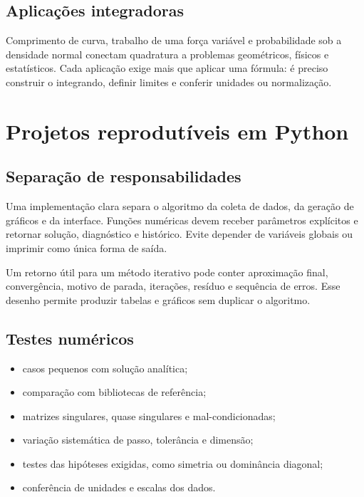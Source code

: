 \documentclass[12pt,a4paper,openany]{book}
\begin{document}
\section{Aplicações integradoras}



Comprimento de curva, trabalho de uma força variável e probabilidade sob a densidade normal conectam quadratura a problemas geométricos, físicos e estatísticos. Cada aplicação exige mais que aplicar uma fórmula: é preciso construir o integrando, definir limites e conferir unidades ou normalização.



\chapter{Projetos reprodutíveis em Python}



\section{Separação de responsabilidades}



Uma implementação clara separa o algoritmo da coleta de dados, da geração de gráficos e da interface. Funções numéricas devem receber parâmetros explícitos e retornar solução, diagnóstico e histórico. Evite depender de variáveis globais ou imprimir como única forma de saída.



Um retorno útil para um método iterativo pode conter aproximação final, convergência, motivo de parada, iterações, resíduo e sequência de erros. Esse desenho permite produzir tabelas e gráficos sem duplicar o algoritmo.



\section{Testes numéricos}



\begin{itemize}
\item casos pequenos com solução analítica;
\item comparação com bibliotecas de referência;
\item matrizes singulares, quase singulares e mal-condicionadas;
\item variação sistemática de passo, tolerância e dimensão;
\item testes das hipóteses exigidas, como simetria ou dominância diagonal;
\item conferência de unidades e escalas dos dados.
\end{itemize}
\end{document}
